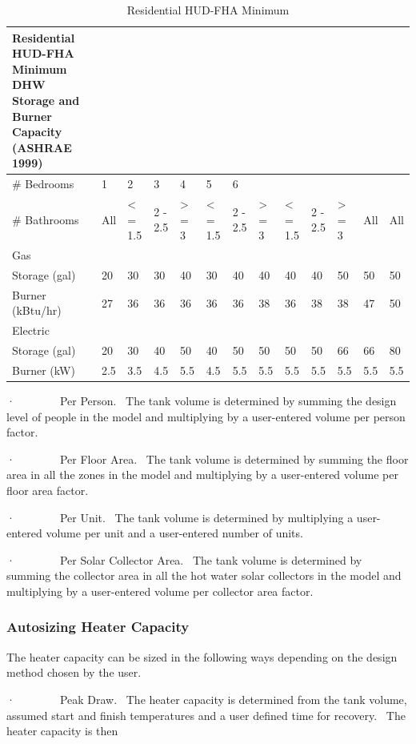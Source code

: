 \begin{longtable}[c]{p{0.46in}p{0.46in}p{0.46in}p{0.46in}p{0.46in}p{0.46in}p{0.46in}p{0.46in}p{0.46in}p{0.46in}p{0.46in}p{0.46in}p{0.46in}}
\caption{Residential HUD-FHA Minimum \protect \label{table:residential-hud-fha-minimum}}\\
\toprule 
Residential HUD-FHA Minimum DHW Storage and Burner Capacity (ASHRAE 1999) \tabularnewline \midrule
\endhead
\# Bedrooms & 1 & 2 & 3 & 4 & 5 & 6 \tabularnewline
\# Bathrooms & All & <  = 1.5 & 2 - 2.5 & >  = 3 & <  = 1.5 & 2 - 2.5 & >  = 3 & <  = 1.5 & 2 - 2.5 & >  = 3 & All & All \tabularnewline
Gas &  &  &  &  &  &  &  &  &  &  &  &  \tabularnewline
Storage (gal) & 20 & 30 & 30 & 40 & 30 & 40 & 40 & 40 & 40 & 50 & 50 & 50 \tabularnewline
Burner (kBtu/hr) & 27 & 36 & 36 & 36 & 36 & 36 & 38 & 36 & 38 & 38 & 47 & 50 \tabularnewline
Electric &  &  &  &  &  &  &  &  &  &  &  &  \tabularnewline
Storage (gal) & 20 & 30 & 40 & 50 & 40 & 50 & 50 & 50 & 50 & 66 & 66 & 80 \tabularnewline
Burner (kW) & 2.5 & 3.5 & 4.5 & 5.5 & 4.5 & 5.5 & 5.5 & 5.5 & 5.5 & 5.5 & 5.5 & 5.5 \tabularnewline
\bottomrule
\end{longtable}

·~~~~~~~~Per Person.~ The tank volume is determined by summing the design level of people in the model and multiplying by a user-entered volume per person factor.

·~~~~~~~~Per Floor Area.~ The tank volume is determined by summing the floor area in all the zones in the model and multiplying by a user-entered volume per floor area factor.

·~~~~~~~~Per Unit.~ The tank volume is determined by multiplying a user-entered volume per unit and a user-entered number of units.

·~~~~~~~~Per Solar Collector Area.~ The tank volume is determined by summing the collector area in all the hot water solar collectors in the model and multiplying by a user-entered volume per collector area factor.

\subsubsection{Autosizing Heater Capacity}\label{autosizing-heater-capacity}

The heater capacity can be sized in the following ways depending on the design method chosen by the user.

·~~~~~~~~Peak Draw.~ The heater capacity is determined from the tank volume, assumed start and finish temperatures and a user defined time for recovery.~ The heater capacity is then

